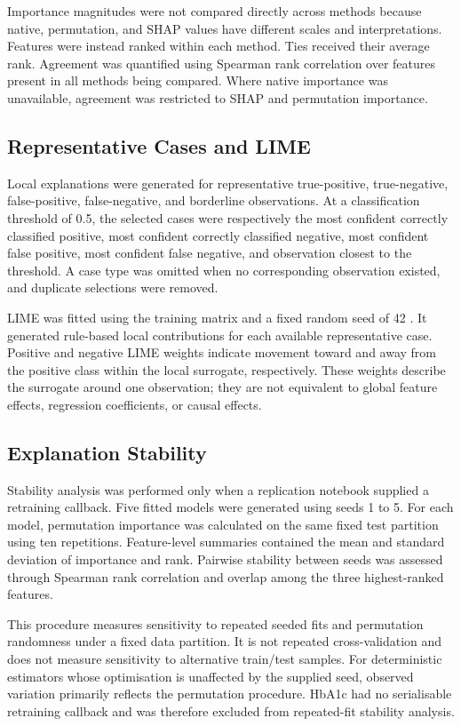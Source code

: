 Importance magnitudes were not compared directly across methods because native, permutation, and SHAP values have different scales and interpretations. Features were instead ranked within each method. Ties received their average rank. Agreement was quantified using Spearman rank correlation over features present in all methods being compared. Where native importance was unavailable, agreement was restricted to SHAP and permutation importance.

\subsection{Representative Cases and LIME}

Local explanations were generated for representative true-positive, true-negative, false-positive, false-negative, and borderline observations. At a classification threshold of 0.5, the selected cases were respectively the most confident correctly classified positive, most confident correctly classified negative, most confident false positive, most confident false negative, and observation closest to the threshold. A case type was omitted when no corresponding observation existed, and duplicate selections were removed.

LIME was fitted using the training matrix and a fixed random seed of 42 \citep{ribeiro_why_2016}. It generated rule-based local contributions for each available representative case. Positive and negative LIME weights indicate movement toward and away from the positive class within the local surrogate, respectively. These weights describe the surrogate around one observation; they are not equivalent to global feature effects, regression coefficients, or causal effects.

\subsection{Explanation Stability}

Stability analysis was performed only when a replication notebook supplied a retraining callback. Five fitted models were generated using seeds 1 to 5. For each model, permutation importance was calculated on the same fixed test partition using ten repetitions. Feature-level summaries contained the mean and standard deviation of importance and rank. Pairwise stability between seeds was assessed through Spearman rank correlation and overlap among the three highest-ranked features.

This procedure measures sensitivity to repeated seeded fits and permutation randomness under a fixed data partition. It is not repeated cross-validation and does not measure sensitivity to alternative train/test samples. For deterministic estimators whose optimisation is unaffected by the supplied seed, observed variation primarily reflects the permutation procedure. HbA1c had no serialisable retraining callback and was therefore excluded from repeated-fit stability analysis.

